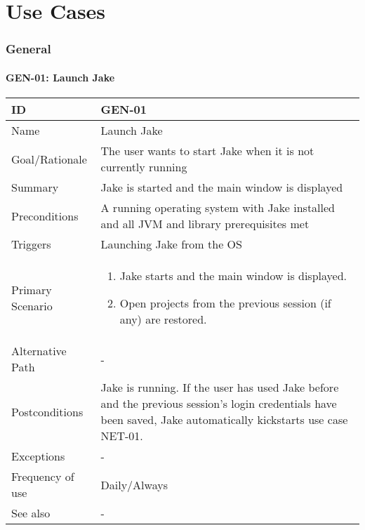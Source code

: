 \part{Use Cases}
\section{General}

\def\ucreset{
\def\ucid{-}
\def\ucname{-}
\def\ucstatus{-} %
\def\ucrationale{-}
\def\ucsummary{-}
\def\ucpreconditions{-}
\def\uctriggers{-}
\def\ucprimaryscenario{-}
\def\ucalternativepath{-}
\def\ucexceptions{-}
\def\ucpostconditions{-}
\def\ucfrequency{-}
\def\ucsee{-}
}

\def\ucprint{
\subsection{\ucid: \ucname}
\begin{tabular}{|p{3.3cm}|p{12cm}|}
\hline
ID & \ucid \\ 
\hline 
Name & \ucname \\
\hline
Goal/Rationale & \ucrationale \\ 
\hline 
Summary & \ucsummary \\ 
\hline
Preconditions & \ucpreconditions \\
\hline
Triggers & \uctriggers \\
\hline
Primary Scenario & \ucprimaryscenario \\
\hline
Alternative Path & \ucalternativepath \\
\hline
Postconditions & \ucpostconditions  \\
\hline
Exceptions & \ucexceptions \\
\hline
Frequency of use & \ucfrequency  \\
\hline
See also & \ucsee \\
\hline
\end{tabular}
}


\ucreset
\def\ucid{GEN-01}
\def\ucname{Launch Jake}
\def\ucstatus{Review required} %
\def\ucrationale{The user wants to start Jake when it is not currently running}
\def\ucsummary{Jake is started and the main window is displayed}
\def\ucpreconditions{A running operating system with Jake installed and all JVM and library prerequisites met}
\def\uctriggers{Launching Jake from the OS}
\def\ucprimaryscenario{
\begin{enumerate}
\item Jake starts and the main window is displayed.
\item Open projects from the previous session (if any) are restored.
\end{enumerate}}
\def\ucpostconditions{Jake is running. If the user has used Jake before and the previous session's login credentials have been saved, Jake automatically kickstarts use case NET-01.}
\def\ucfrequency{Daily/Always}
\ucprint

